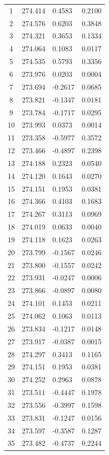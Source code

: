\begin{longtable}{|c|p{3.2cm}|p{3.5cm}|p{3.5cm}|}
1  & 274.414 & 0.4583 & 0.2100 \\
2  & 274.576 & 0.6203 & 0.3848 \\
3  & 274.321 & 0.3653 & 0.1334 \\
4  & 274.064 & 0.1083 & 0.0117 \\
5  & 274.535 & 0.5793 & 0.3356 \\
6  & 273.976 & 0.0203 & 0.0004 \\
7  & 273.694 & -0.2617 & 0.0685 \\
8  & 273.821 & -0.1347 & 0.0181 \\
9  & 273.784 & -0.1717 & 0.0295 \\
10 & 273.993 & 0.0373 & 0.0014 \\
11 & 273.358 & -0.5977 & 0.3572 \\
12 & 273.466 & -0.4897 & 0.2398 \\
13 & 274.188 & 0.2323 & 0.0540 \\
14 & 274.120 & 0.1643 & 0.0270 \\
15 & 274.151 & 0.1953 & 0.0381 \\
16 & 274.366 & 0.4103 & 0.1683 \\
17 & 274.267 & 0.3113 & 0.0969 \\
18 & 274.019 & 0.0633 & 0.0040 \\
19 & 274.118 & 0.1623 & 0.0263 \\
20 & 273.799 & -0.1567 & 0.0246 \\
21 & 273.800 & -0.1557 & 0.0242 \\
22 & 273.931 & -0.0247 & 0.0006 \\
23 & 273.866 & -0.0897 & 0.0080 \\
24 & 274.101 & 0.1453 & 0.0211 \\
25 & 274.062 & 0.1063 & 0.0113 \\
26 & 273.834 & -0.1217 & 0.0148 \\
27 & 273.917 & -0.0387 & 0.0015 \\
28 & 274.297 & 0.3413 & 0.1165 \\
29 & 274.151 & 0.1953 & 0.0381 \\
30 & 274.252 & 0.2963 & 0.0878 \\
31 & 273.511 & -0.4447 & 0.1978 \\
32 & 273.556 & -0.3997 & 0.1598 \\
33 & 273.831 & -0.1247 & 0.0156 \\
34 & 273.597 & -0.3587 & 0.1287 \\
35 & 273.482 & -0.4737 & 0.2244 \\

\end{longtable}
